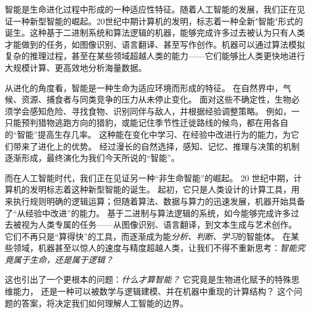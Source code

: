 智能是生命进化过程中形成的一种适应性特征。随着人工智能的发展，我们正在见证一种新型智能的崛起。20世纪中期计算机的发明，标志着一种全新"智能"形式的诞生。这种基于二进制系统和算法逻辑的机器，能够完成许多过去被认为只有人类才能做到的任务，如图像识别、语言翻译、甚至写作创作。机器可以通过算法模拟复杂的推理过程，甚至在某些领域超越人类的能力——它们能够比人类更快地进行大规模计算、更高效地分析海量数据。


从进化的角度看，智能是一种生命为适应环境而形成的特征。
在自然界中，气候、资源、捕食者与同类竞争的压力从未停止变化。
面对这些不确定性，生物必须学会感知危险、寻找食物、识别同伴与敌人，并根据经验调整策略。
例如，一只能预判猎物逃跑方向的猎豹，或能记住季节性迁徙路线的候鸟，都在用各自的“智能”提高生存几率。
这种能在变化中学习、在经验中改进行为的能力，为它们带来了进化上的优势。
经过漫长的自然选择，感知、记忆、推理与决策的机制逐渐形成，最终演化为我们今天所说的“智能”。

而在人工智能时代，我们正在见证另一种“非生命智能”的崛起。
20 世纪中期，计算机的发明标志着这种新型智能的诞生。
起初，它只是人类设计的计算工具，用来执行规则明确的逻辑运算；但随着算法、数据与算力的迅速发展，机器开始具备了“从经验中改进”的能力。
基于二进制与算法逻辑的系统，如今能够完成许多过去被视为人类专属的任务——从图像识别、语言翻译，到文本生成与艺术创作。
它们不再只是“算得快”的工具，而逐渐成为能\emph{分析、判断、学习}的智能体。
在某些领域，机器甚至以惊人的速度与精度超越人类，让我们不得不重新思考：\emph{智能究竟属于生命，还是属于逻辑？}


这也引出了一个更根本的问题：\emph{什么才算智能？}
它究竟是生物进化赋予的特殊思维能力，
还是一种可以被数学与逻辑建模、并在机器中重现的计算结构？
这个问题的答案，将决定我们如何理解人工智能的边界。



